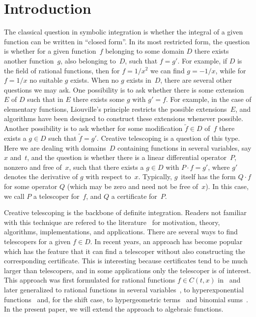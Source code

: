 \documentclass{sig-alternate}
\begin{document}


\section{Introduction}\label{SECT:intro}

The classical question in symbolic integration is whether the integral of
a given function can be written in ``closed form''. In its most restricted form,
the question is whether for a given function~$f$ belonging to some domain $D$
there exists another function~$g$, also belonging to~$D$, such that $f=g'$. For
example, if $D$ is the field of rational functions, then for $f=1/x^2$ we can
find $g=-1/x$, while for $f=1/x$ no suitable $g$ exists. When no $g$ exists
in~$D$, there are several other questions we may ask. One possibility is to ask
whether there is some extension~$E$ of $D$ such that in $E$ there exists some
$g$ with $g'=f$. For example, in the case of elementary functions, Liouville's
principle restricts the possible extensions~$E$, and algorithms have been
designed to construct these extensions whenever possible. Another possibility is
to ask whether for some modification $\tilde f\in D$ of~$f$ there exists a $g\in
D$ such that $\tilde f=g'$. Creative telescoping is a question of this
type. Here we are dealing with domains~$D$ containing functions in several
variables, say $x$ and~$t$, and the question is whether there is a linear
differential operator~$P$, nonzero and free of~$x$, such that there exists a
$g\in D$ with $P\cdot f=g'$, where $g'$ denotes the derivative of $g$ with
respect to~$x$. Typically, $g$~itself has the form $Q\cdot f$ for some operator
$Q$ (which may be zero and need not be free of~$x$). In this case, we call $P$
a telescoper for~$f$, and $Q$ a certificate for~$P$.

Creative telescoping is the backbone of definite integration. Readers not
familiar with this technique are refered to the literature~\cite{PWZbook1996,Zeilberger1990c,Zeilberger1991,Zeilberger1990,Koepf1998}
for motivation, theory, algorithms, implementations, and applications. There are
several ways to find telescopers for a given $f\in D$. In recent years, an
approach has become popular which has the feature that it can find a telescoper
without also constructing the corresponding certificate. This is interesting
because certificates tend to be much larger than telescopers, and in some
applications only the telescoper is of interest. This approach was first
formulated for rational functions $f\in C(t,x)$ in~\cite{BCCL2010} and later
generalized to rational functions in several variables~\cite{bostan13}, to
hyperexponential functions~\cite{bostan13a} and, for the shift case, to hypergeometric
terms~\cite{chen15a} and binomial sums~\cite{bostan15}. In the present paper, we will extend
the approach to algebraic functions.
\end{document}
